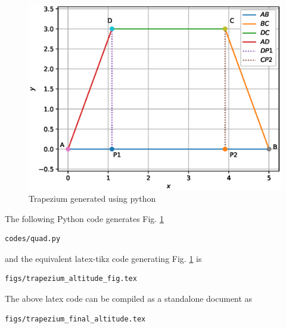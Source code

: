 \begin{enumerate}[label=\thesection.\arabic*.,ref=\thesection.\theenumi]
\begin{figure}[!ht]
\centering
\includegraphics[width=\columnwidth]{./figs/trapezium_altitude.eps}
\caption{Trapezium generated using python}
\label{fig:trapezium2}
\end{figure} 

\solution The  following Python code generates Fig. \ref{fig:trapezium2}

\begin{lstlisting}
codes/quad.py
\end{lstlisting}

and the equivalent latex-tikz code generating Fig. \ref{fig:trapezium2} is 
\begin{lstlisting}
figs/trapezium_altitude_fig.tex
\end{lstlisting}
%
The above latex code can be compiled as a standalone document as
\begin{lstlisting}
figs/trapezium_final_altitude.tex
\end{lstlisting}
\end{enumerate}

